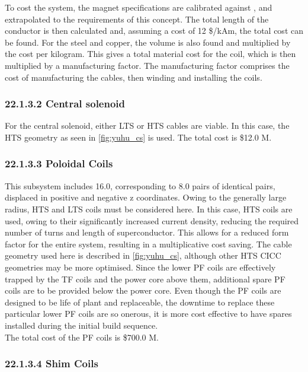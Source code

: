 To cost the system, the magnet specifications are calibrated against \cite{Menard2016}, and extrapolated to the requirements of this concept. The total length of the conductor is then calculated and, assuming a cost of 12 \$/kAm, the total cost can be found. For the steel and copper, the volume is also found and multiplied by the cost per kilogram. This gives a total material cost for the coil, which is then multiplied by a manufacturing factor. The manufacturing factor comprises the cost of manufacturing the cables, then winding and installing the coils. \\

\subsubsection*{22.1.3.2 Central solenoid}

For the central solenoid, either LTS or HTS cables are viable. In this case, the HTS geometry as seen in \ref{fig:yuhu_cs} is used. The total cost is \$12.0 M.

\subsubsection*{22.1.3.3 Poloidal Coils}

This subsystem includes 16.0, corresponding to 8.0 pairs of identical pairs, displaced in positive and negative z coordinates. Owing to the generally large radius, HTS and LTS coils must be considered here. In this case, HTS coils are used, owing to their significantly increased current density, reducing the required number of turns and length of superconductor. This allows for a reduced form factor for the entire system, resulting in a multiplicative cost saving. The cable geometry used here is described in \ref{fig:yuhu_cs}, although other HTS CICC geometries may be more optimised.
Since the lower PF coils are effectively trapped by the TF coils and the power core above them, additional spare PF coils are to be provided below the power core. Even though the PF coils are designed to be life of plant and replaceable, the downtime to replace these particular lower PF coils are so onerous, it is more cost effective to have spares installed during the initial build sequence.  \\

The total cost of the PF coils is \$700.0 M. \\

\subsubsection*{22.1.3.4 Shim Coils}

